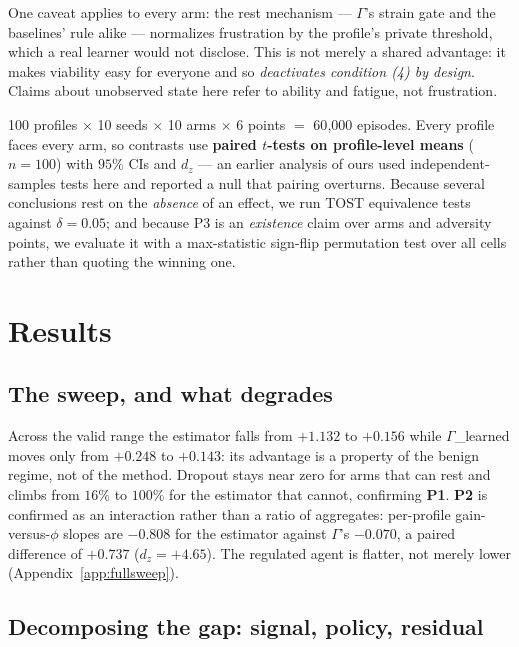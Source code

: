 \documentclass{article}
\begin{document}
One caveat applies to every arm: the rest mechanism --- $\Gamma$'s strain gate and the baselines' rule alike --- normalizes frustration by the profile's private threshold, which a real learner would not disclose. This is not merely a shared advantage: it makes viability easy for everyone and so \emph{deactivates condition (4) by design}. Claims about unobserved state here refer to ability and fatigue, not frustration.

100 profiles $\times$ 10 seeds $\times$ 10 arms $\times$ 6 points $=$ 60{,}000 episodes. Every profile faces every arm, so contrasts use \textbf{paired $t$-tests on profile-level means} ($n{=}100$) with $95\%$ CIs and $d_z$ --- an earlier analysis of ours used independent-samples tests here and reported a null that pairing overturns. Because several conclusions rest on the \emph{absence} of an effect, we run TOST equivalence tests against $\delta{=}0.05$; and because P3 is an \emph{existence} claim over arms and adversity points, we evaluate it with a max-statistic sign-flip permutation test over all cells rather than quoting the winning one.

\section{Results}
\label{sec:results}

\subsection{The sweep, and what degrades}
\label{sec:sweep}

Across the valid range the estimator falls from $+1.132$ to $+0.156$ while $\Gamma$\_learned moves only from $+0.248$ to $+0.143$: its advantage is a property of the benign regime, not of the method. Dropout stays near zero for arms that can rest and climbs from $16\%$ to $100\%$ for the estimator that cannot, confirming \textbf{P1}. \textbf{P2} is confirmed as an interaction rather than a ratio of aggregates: per-profile gain-versus-$\phi$ slopes are $-0.808$ for the estimator against $\Gamma$'s $-0.070$, a paired difference of $+0.737$ ($d_z{=}{+}4.65$). The regulated agent is flatter, not merely lower (Appendix~\ref{app:fullsweep}).

\subsection{Decomposing the gap: signal, policy, residual}
\label{sec:decomp}
\end{document}
